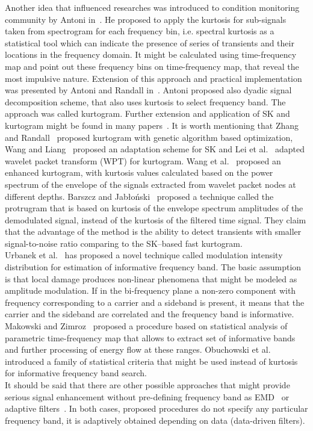 \documentclass[3p,times]{elsarticle}
\begin{document}
Another idea that influenced researches was introduced to condition monitoring community by Antoni in~\cite{bib20}. He proposed to apply the kurtosis for sub-signals taken from spectrogram for each frequency bin, i.e. spectral kurtosis  as a statistical tool which can indicate the presence of series of transients and their locations in the frequency domain. It might be calculated using time-frequency map and point out these frequency bins on time-frequency map, that reveal the most  impulsive nature. Extension of this approach and practical implementation was presented by Antoni and Randall in~\cite{bib23}.
Antoni proposed also dyadic signal decomposition scheme, that also uses kurtosis to select frequency band. The approach was called kurtogram.  Further extension and application of SK and kurtogram might be found in many papers~\cite{bib24,bib46,bib47,bib48,bib49}. 
It is worth mentioning that Zhang and Randall~\cite{bib49} proposed kurtogram with genetic algorithm based optimization, Wang and Liang~\cite{bib46} proposed an adaptation scheme for SK and Lei et al.~\cite{bib48} adapted wavelet packet transform (WPT) for kurtogram. Wang et al.~\cite{bib47} proposed an enhanced kurtogram, with kurtosis values calculated based on the power spectrum of the envelope of the signals extracted from wavelet packet nodes at different depths. Barszcz and Jab{\l}o{\'n}ski~\cite{bib25}  proposed a technique called the protrugram  that is based on kurtosis of the envelope spectrum amplitudes of the demodulated signal, instead of the kurtosis of the filtered time signal. They claim that the advantage of the method is the ability to detect transients with smaller signal-to-noise ratio comparing to the SK--based fast kurtogram.\\
Urbanek et al.~\cite{bib27} has proposed a novel technique called modulation intensity distribution for  estimation of informative frequency band. The basic assumption is that local damage produces non-linear phenomena that might be modeled as amplitude modulation. If in the bi-frequency plane a non-zero component with frequency corresponding to a carrier and a sideband is present, it means that the carrier and the sideband are correlated and the frequency band is informative. Makowski and Zimroz~\cite{bib28} proposed a procedure based on statistical analysis of parametric time-frequency map that allows to extract set of informative bands and further processing of energy flow at these ranges. Obuchowski et al.~\cite{bib29}  introduced a family of statistical criteria that might be used instead of kurtosis for informative frequency band search.\\
It should be said that there are other possible approaches that might provide serious signal enhancement without pre-defining frequency band as EMD~\cite{bib33,bib50} or adaptive filters~\cite{bib18,bib32,bib35,bib30}. In both cases, proposed procedures do not specify any particular frequency band, it is adaptively obtained depending on data (data-driven filters).
\end{document}
